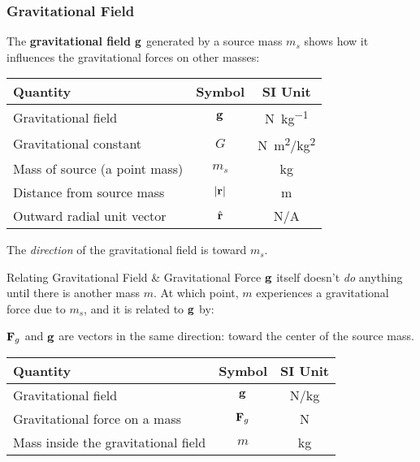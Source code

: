 \documentclass[12pt,compress,aspectratio=169]{beamer}
\newcommand{\mb}[1]{\ensuremath\mathbf{#1}}
\newcommand{\eq}[2]{\vspace{#1}{\Large\begin{displaymath}#2\end{displaymath}}}
\begin{document}
\begin{frame}
  \frametitle{Gravitational Field}
  The \textbf{gravitational field} $\mb{g}$ generated by a source mass $m_s$
  shows how it influences the gravitational forces on other masses:

  \eq{-.2in}{
    \boxed{\mb{g}(m_s,\mb{r})=-\frac{Gm_s}{|\mb{r}|^2}\hat{\mb{r}}}
  }
  \begin{center}
    \begin{tabular}{l|c|c}
      \rowcolor{pink}
      \textbf{Quantity} & \textbf{Symbol} & \textbf{SI Unit} \\ \hline
      Gravitational field & $\mb{g}$ & \si{\newton\per\kilo\gram}\\
      Gravitational constant & $G$ & \si{\newton\metre^2/\kilo\gram^2} \\
      Mass of source (a point mass) & $m_s$ & \si{\kilo\gram} \\
      Distance from source mass     & $|\mb{r}|$ & \si{\metre}\\
      Outward radial unit vector    & $\hat{\mb{r}}$ & N/A
    \end{tabular}
  \end{center}

  The \emph{direction} of the gravitational field is toward $m_s$.
\end{frame}



\begin{frame}{Relating Gravitational Field \& Gravitational Force}
  $\mb{g}$ itself doesn't \emph{do} anything until there is another mass $m$. At
  which point, $m$ experiences a gravitational force due to $m_s$, and it is
  related to $\mb{g}$ by:

  \eq{-.2in}{
    \boxed{\mb{F}_g=m\mb{g}}
  }
  
  $\mb{F}_g$ and  $\mb{g}$ are vectors in the same direction: toward the
  center of the source mass.
  \begin{center}
    \begin{tabular}{l|c|c}
      \rowcolor{pink}
      \textbf{Quantity} & \textbf{Symbol} & \textbf{SI Unit} \\ \hline
      Gravitational field & $\mb{g}$   & \si{N/kg}\\
      Gravitational force on a mass & $\mb{F}_g$ & \si{\newton} \\
      Mass inside the gravitational field & $m$ & \si{\kilo\gram}
    \end{tabular}
  \end{center}
\end{frame}
\end{document}
